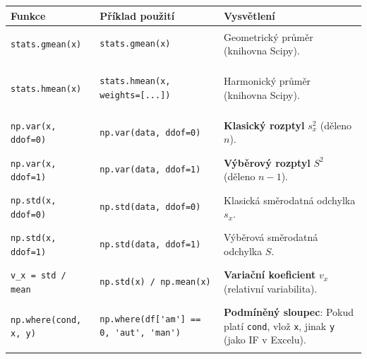 \documentclass[a4paper, 11pt]{article}
\newenvironment{funkcedict}
{%
  \begingroup
  \renewcommand{\arraystretch}{1.4}%
  \lstset{basicstyle=\ttfamily\small, columns=fullflexible}%
  \setlength{\tabcolsep}{4pt}%
  \begin{tabular}{p{0.19\textwidth} p{0.38\textwidth} p{0.30\textwidth}}
  \textbf{Funkce} & \textbf{Příklad použití} & \textbf{Vysvětlení} \\
  \midrule
}
{%
  \end{tabular}%
  \endgroup
}
\begin{document}
			\begin{funkcedict}
				\texttt{stats.gmean(x)} &
				\begin{lstlisting}
stats.gmean(x)
				\end{lstlisting}
				& Geometrický průměr (knihovna Scipy). \\
				\texttt{stats.hmean(x)} &
				\begin{lstlisting}
stats.hmean(x, weights=[...])
				\end{lstlisting}
				& Harmonický průměr (knihovna Scipy). \\
				\texttt{np.var(x, ddof=0)} &
				\begin{lstlisting}
np.var(data, ddof=0)
				\end{lstlisting}
				& \textbf{Klasický rozptyl} $s_x^2$ (děleno $n$). \\
				\texttt{np.var(x, ddof=1)} &
				\begin{lstlisting}
np.var(data, ddof=1)
				\end{lstlisting}
				& \textbf{Výběrový rozptyl} $S^2$ (děleno $n-1$). \\
				\texttt{np.std(x, ddof=0)} &
				\begin{lstlisting}
np.std(data, ddof=0)
				\end{lstlisting}
				& Klasická směrodatná odchylka $s_x$. \\
				\texttt{np.std(x, ddof=1)} &
				\begin{lstlisting}
np.std(data, ddof=1)
				\end{lstlisting}
				& Výběrová směrodatná odchylka $S$. \\
				\texttt{v\_x = std / mean} &
				\begin{lstlisting}
np.std(x) / np.mean(x)
				\end{lstlisting}
				& \textbf{Variační koeficient} $v_x$ (relativní variabilita). \\
				\texttt{np.where(cond, x, y)} &
				\begin{lstlisting}
np.where(df['am'] == 0, 'aut', 'man')
				\end{lstlisting}
				& \textbf{Podmíněný sloupec}: Pokud platí \texttt{cond}, vlož \texttt{x}, jinak \texttt{y} (jako IF v Excelu). \\
			\end{funkcedict}

			\clearpage
\end{document}

